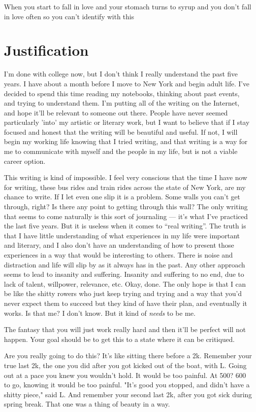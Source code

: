 \documentclass[12pt]{article}
\begin{document}
When you start to fall in love
and your stomach turns to syrup
and you don't fall in love often
so you can't identify with this

\section{Justification}
I'm done with college now, but I don't think I really understand the past five
years.  I have about a month before I move to New York and begin adult life.
I've decided to spend this time reading my notebooks, thinking about past
events, and trying to understand them.  I'm putting all of the writing on the
Internet, and hope it'll be relevant to someone out there.  People have never
seemed particularly 'into' my artistic or literary work, but I want to believe
that if I stay focused and honest that the writing will be beautiful and
useful.  If not, I will begin my working life knowing that I tried writing, and
that writing is a way for me to communicate with myself and the people in my
life, but is not a viable career option.

This writing is kind of impossible.  I feel very conscious that the time I have
now for writing, these bus rides and train rides across the state of New York,
are my chance to write.  If I let even one slip it is a problem.  Some walls you
can't get through, right?  Is there any point to getting through this wall?  The
only writing that seems to come naturally is this sort of journaling --- it's
what I've practiced the last five years.  But it is useless when it comes to
``real writing''.  The truth is that I have little understanding of what
experiences in my life were important and literary, and I also don't have an
understanding of how to present those experiences in a way that would be
interesting to others.  There is noise and distraction and life will slip by as
it always has in the past.  Any other approach seems to lead to insanity and
suffering.  Insanity and suffering to no end, due to lack of talent, willpower,
relevance, etc.  Okay, done.  The only hope is that I can be like the shitty
rowers who just keep trying and trying and a way that you'd never expect them to
succeed but they kind of have their plan, and eventually it works.  Is that me?
I don't know.  But it kind of \textit{needs} to be me.

The fantasy that you will just work really hard and then it'll be perfect will
not happen.  Your goal should be to get this to a state where it can be
critiqued.

Are you really going to do this?  It's like sitting there before a 2k.  Remember
your true last 2k, the one you did after you got kicked out of the boat, with
L.  Going out at a pace you knew you wouldn't hold.  It would be too
painful.  At 500?  600 to go, knowing it would be too painful.  "It's good you
stopped, and didn't have a shitty piece," said L.  And remember your second last
2k, after you got sick during spring break.  That one was a thing of beauty in a
way.  
\end{document}
